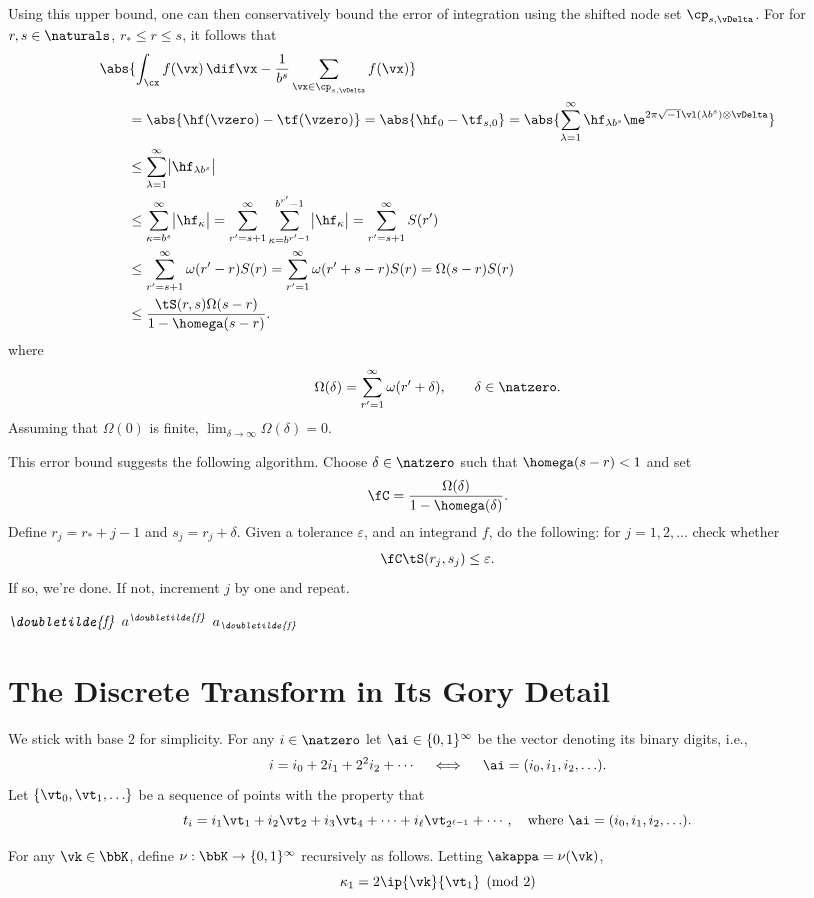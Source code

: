 \documentclass[]{elsarticle}
\newcommand{\fudge}{\fC}
\newcommand{\dtf}{\textit{\doubletilde{f}}}
\theoremstyle{definition}
\begin{document}
Using this upper bound, one can then conservatively bound the error of integration using the shifted node set $\cp_{s,\vDelta}$.  For for $r, s \in \naturals$, $r_* \le r \le s$, it follows that 
\begin{align*}
\MoveEqLeft{\abs{\int_{\cx} f(\vx) \, \dif \vx - \frac{1}{b^s} \sum_{\vx \in \cp_{s,\vDelta}} f(\vx) }}\\
&= \abs{\hf(\vzero) - \tf(\vzero)} = \abs{\hf_0 - \tf_{s,0}} = \abs{\sum_{\lambda=1}^{\infty} \hf_{\lambda b^{s}} \me^{2 \pi \sqrt{-1} \vl(\lambda b^{s}) \otimes \vDelta}}\\
&\le \sum_{\lambda=1}^{\infty} \bigl \lvert \hf_{\lambda b^{s}} \bigr \rvert \\
&\le \sum_{\kappa=b^{s}}^{\infty} \bigl \lvert \hf_{\kappa} \bigr \rvert = \sum_{r'=s+1}^{\infty} \sum_{\kappa=b^{r'-1}}^{b^{r'}-1} \bigl \lvert \hf_{\kappa} \bigr \rvert = \sum_{r'=s+1}^{\infty} S(r')\\
&\le \sum_{r'=s+1}^{\infty} \omega(r'-r) S(r) =   \sum_{r'=1}^{\infty} \omega(r'+s-r) S(r) =  \Omega(s-r) S(r)\\
& \le \frac{\tS(r,s)\Omega(s-r)}{1 - \homega(s-r)}.
\end{align*}
where 
\[
\Omega(\delta)=\sum_{r'=1}^{\infty} \omega(r'+ \delta), \qquad \delta \in \natzero.
\]
Assuming that $\Omega(0)$ is finite, $\lim_{\delta \to \infty} \Omega(\delta) = 0$.

This error bound suggests the following algorithm.  Choose $\delta \in \natzero$ such that $\homega(s-r)<1$ and set 
\[
\fudge = \frac{\Omega(\delta)}{1 - \homega(\delta)}.
\]
Define $r_j=r_*+j-1$ and $s_j=r_j+\delta$.  Given a tolerance $\varepsilon$, and an integrand $f$, do the following:  for $j=1, 2, \ldots$ check whether
\[
\fudge \tS(r_j,s_j) \le \varepsilon.
\]
If so, we're done.  If not, increment $j$ by one and repeat.


$\dtf$ $a^{\dtf}$ $a_{\dtf}$

\section{The Discrete Transform in Its Gory Detail}

We stick with base $2$ for simplicity.  For any $i\in \natzero$ let $\ai \in \{0,1\}^\infty$ be the vector denoting its binary digits, i.e., 
\[
i=i_0+2i_1+2^2i_2+ \cdots \quad \iff \quad \ai=(i_0,i_1,i_2, \ldots ).
\]
Let $\{\vt_0, \vt_1, \ldots\}$ be a sequence of points with the property that 
\[
t_i= i_1 \vt_1 +i_2 \vt_2 + i_3 \vt_4 + \cdots + i_\ell \vt_{2^{\ell-1}} + \cdots, \quad \text{where } \ai=(i_0,i_1,i_2, \ldots ).
\]

For any $\vk \in \bbK$, define $\nu: \bbK \to  \{0,1\}^\infty$ recursively as follows. Letting $\akappa=\nu(\vk)$, 
\[
\kappa_1 = 2\ip{\vk}{\vt_1} \pmod 2
\]  




\end{document}
